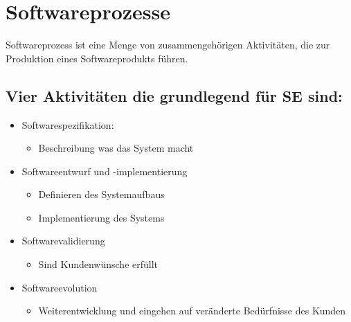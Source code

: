 \chapter{Softwareprozesse}
Softwareprozess ist eine Menge von zusammengehörigen Aktivitäten, die zur Produktion eines Softwareprodukts führen.
\section{Vier Aktivitäten die grundlegend für SE sind:}
\begin{itemize}
    \item Softwarespezifikation:
    \begin{itemize}
        \item Beschreibung was das System macht
    \end{itemize}
    \item Softwareentwurf und -implementierung
    \begin{itemize}
        \item Definieren des Systemaufbaus
        \item Implementierung des Systems
    \end{itemize}
    \item Softwarevalidierung
    \begin{itemize}
        \item Sind Kundenwünsche erfüllt
    \end{itemize}
    \item Softwareevolution
    \begin{itemize}
        \item Weiterentwicklung und eingehen auf veränderte Bedürfnisse des Kunden
    \end{itemize}
\end{itemize}

